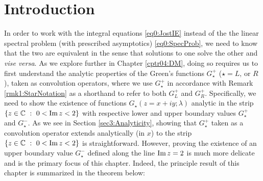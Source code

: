 \documentclass[../dissertation.tex]{subfiles}
\begin{document}
\section{Introduction}\label{sec3:Intro}
In order to work with the integral 
equations \eqref{eq0:JostIE} instead of the the linear spectral problem (with 
prescribed asymptotics) \eqref{eq0:SpecProb}, we need to know that the two are 
equivalent in the sense that solutions to one solve the other and \textit{vise
versa}. As we explore further in Chapter \ref{cptr04:DM}, doing so requires
us to first understand the analytic properties of the Green's functions 
$G_\star^+$ ($\star = L \text{, or }R$), taken as convolution operators, where 
we use $G_\star^+$ in accordance with Remark \ref{rmk1:StarNotation} as a 
shorthand to refer to both $G_L^+$ and $G_R^+$. Specifically, we need to show 
the existence of functions $G_\star(z=x+iy; \lambda)$ analytic in the strip 
$\{z \in \mathbb C ~:~ 0 < \operatorname{Im} z < 2 \}$ with respective 
lower and upper boundary values $G_\star^+$ and $G_\star^-$. As we 
see in Section \ref{sec3:Analyticity}, showing that $G_\star^+$ taken as a 
convolution operator extends analytically (in $x$) to the strip 
$\{z \in \mathbb C ~:~ 0 < \operatorname{Im} z < 2 \}$ is straightforward. However, proving the 
existence of an upper boundary value $G_\star^-$ defined along the line $\operatorname{Im} z = 2$
is much more delicate and is the primary focus of this chapter. Indeed, the principle
result of this chapter is summarized in the theorem below:
\end{document}
